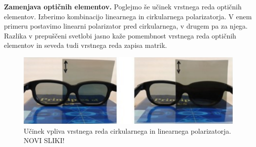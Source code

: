 \begin{example}{\bf Zamenjava optičnih elementov.}
Poglejmo še učinek vrstnega reda optičnih elementov. Izberimo
kombinacijo linearnega in cirkularnega polarizatorja. V enem primeru postavimo
linearni polarizator pred cirkularnega, v drugem pa za njega. Razlika
v prepuščeni svetlobi jasno kaže pomembnost vrstnega reda optičnih
elementov in seveda tudi vrstnega reda zapisa matrik.
\begin{figure}[h!]
\centering
\includegraphics[width=13truecm]{slike/03_VrstniRed.png}
\caption{Učinek vpliva vrstnega reda cirkularnega in linearnega polarizatorja.
NOVI SLIKI!}
\label{fig:03_VrtsniRed}
\end{figure}
\end{example}

